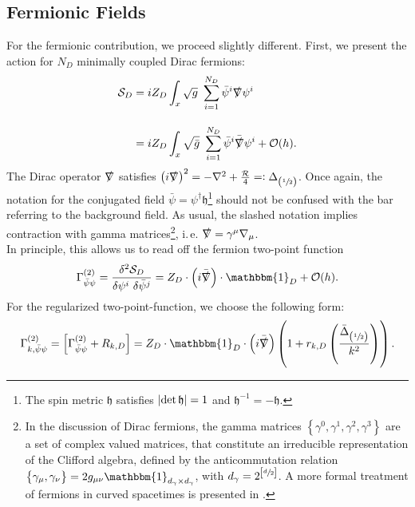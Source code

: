 \subsection{Fermionic  Fields}
For the fermionic contribution, we  proceed slightly different. First, we present the action for $N_D$ minimally coupled Dirac fermions:
\begin{equation}
	\begin{aligned}
		\mathcal{S}_D &= iZ_D\int_x \sqrt{g} \ \sum\limits_{i=1}^{N_D}\bar{\psi}^{i}\slashed{\nabla}\psi^{i} \\[10pt]
		&=  iZ_D\int_x \sqrt{\bar{g}} \ \sum\limits_{i=1}^{N_D}\bar{\psi}^{i}\bar{\slashed{\nabla}}\psi^{i} + \mathcal{O}(h).
	\end{aligned}
\end{equation}
The Dirac operator $\slashed{\nabla}$ satisfies $\left(i\slashed{\nabla}\right)^2 = -\nabla^2 + \frac{\mathcal{R}}{4} =: \Delta_{\left(\sfrac{1}{2}\right)}$.
Once again, the notation for the conjugated field $\bar{\psi} = \psi^{\dagger}\mathfrak{h}$\footnote{The spin metric $\mathfrak{h}$ satisfies $\abs{\operatorname{det} \mathfrak{h}} = 1$ and $\mathfrak{h}^{-1} = -\mathfrak{h}$.} should not be confused with the bar referring to the background field. As usual, the slashed notation implies contraction with gamma matrices\footnote{In the discussion of Dirac fermions, the gamma matrices $\left\{\gamma^0, \gamma^1, \gamma^2, \gamma^3\right\}$ are a set of complex valued matrices, that constitute an irreducible representation of the Clifford algebra, defined by the anticommutation relation $\left\{\gamma_{\mu}, \gamma_{\nu}\right\}= 2g_{\mu\nu} \mathbbm{1}_{d_{\gamma}\times d_{\gamma}}$, with $d_{\gamma} = 2^{\left[\sfrac{d}{2}\right]}$. A more formal treatment of fermions in curved spacetimes is presented in \cite{LippoldtPHD}.}, i.\,e. $\slashed{\nabla} = \gamma^{\mu}\nabla_{\mu}$.  \\
In principle, this allows us to read off the fermion two-point function
\begin{align}
	\Gamma^{(2)}_{\bar{\psi}\psi} = \frac{\delta^2 \mathcal{S}_D}{\delta \psi^{i}\ \delta \bar{\psi}^{j}} = Z_D\cdot\left(i\bar{\slashed{\nabla}}\right)\cdot\mathbbm{1}_D + \mathcal{O}(h).
\end{align}
For the regularized two-point-function, we choose the following form:
\begin{equation}
\Gamma^{(2)}_{k, \bar{\psi}\psi} = \left[\Gamma^{(2)}_{\bar{\psi}\psi} + R_{k,D}\right] = Z_D\cdot\mathbbm{1}_D\cdot\left(i\bar{\slashed{\nabla}}\right) \left(1+r_{k,D}\left(\frac{ \bar{\Delta}_{\left(\sfrac{1}{2}\right)}}{k^2}\right)\right). \label{eqn:fermion_propagator}
\end{equation}
